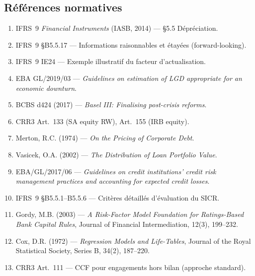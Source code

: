 \documentclass[12pt,a4paper]{article}
\begin{document}
\subsection*{R\'ef\'erences normatives}

\begin{enumerate}
    \item IFRS~9 \textit{Financial Instruments} (IASB, 2014) --- \S5.5 D\'epr\'eciation.
    \item IFRS~9 \S B5.5.17 --- Informations raisonnables et \'etay\'ees (forward-looking).
    \item IFRS~9 IE24 --- Exemple illustratif du facteur d'actualisation.
    \item EBA GL/2019/03 --- \textit{Guidelines on estimation of LGD appropriate for an economic downturn}.
    \item BCBS d424 (2017) --- \textit{Basel III: Finalising post-crisis reforms}.
    \item CRR3 Art.~133 (SA equity RW), Art.~155 (IRB equity).
    \item Merton, R.C. (1974) --- \textit{On the Pricing of Corporate Debt}.
    \item Vasicek, O.A. (2002) --- \textit{The Distribution of Loan Portfolio Value}.
    \item EBA/GL/2017/06 --- \textit{Guidelines on credit institutions' credit risk management practices and accounting for expected credit losses}.
    \item IFRS~9 \S B5.5.1--B5.5.6 --- Crit\`eres d\'etaill\'es d'\'evaluation du SICR.
    \item Gordy, M.B. (2003) --- \textit{A Risk-Factor Model Foundation for Ratings-Based Bank Capital Rules}, Journal of Financial Intermediation, 12(3), 199--232.
    \item Cox, D.R. (1972) --- \textit{Regression Models and Life-Tables}, Journal of the Royal Statistical Society, Series B, 34(2), 187--220.
    \item CRR3 Art.~111 --- CCF pour engagements hors bilan (approche standard).
\end{enumerate}
\end{document}
